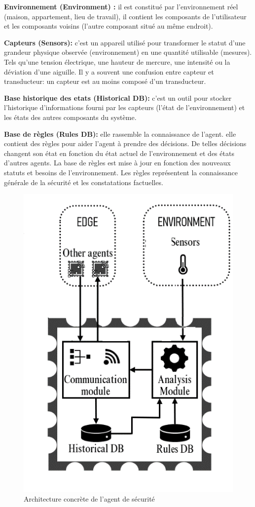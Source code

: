 \textbf{Environnement (Environment) :} il est constitué par l’environnement réel (maison, appartement, lieu de travail), il contient les composants de l’utilisateur et les composants voisins (l’autre composant situé au même endroit).


\textbf{Capteurs (Sensors):} c'est un appareil utilisé pour transformer le statut d'une grandeur physique observée (environnement) en une quantité utilisable (mesures). Tels qu'une tension électrique, une hauteur de mercure, une intensité ou la déviation d'une aiguille. Il y a souvent une confusion entre capteur et transducteur: un capteur est au moins composé d'un transducteur.


\textbf{Base historique des etats (Historical DB):} c'est un outil pour stocker l'historique d'informations fourni par les capteurs (l'état de l'environnement) et les états des autres composants du système.



\textbf{Base de règles (Rules DB):} elle rassemble la connaissance de l'agent. elle contient des règles pour aider l'agent à prendre des décisions. De telles décisions changent son état en fonction du état actuel de l'environnement et des états d'autres agents. La base de règles est mise à jour en fonction des nouveaux statuts et besoins de l'environnement. Les règles  représentent la connaissance générale de la sécurité et les constatations factuelles.


\begin{figure}
  
\centering
\includegraphics[scale=1.2]{chap1/agent2.png}
\caption{Architecture concrète de l'agent de sécurité}
\label{fc9}
\end{figure}
